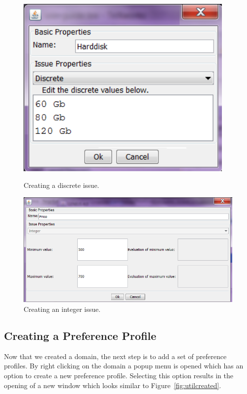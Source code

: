 \documentclass[]{article}
\begin{document}
\begin{figure}[ht]
\center
\begin{minipage}[b]{0.35\linewidth}
	\includegraphics[width=0.95\textwidth]{media/image7a.png}
\caption{Creating a discrete issue.}
\label{fig:createIssueD}
\end{minipage}
\begin{minipage}[b]{0.55\linewidth}
	\includegraphics[width=1.0\textwidth]{media/image7b.png}
\caption{Creating an integer issue.}\label{fig:createIssueI}
\end{minipage}
\end{figure}

\subsection{Creating a Preference Profile}
Now that we created a domain, the next step is to add a set of preference profiles. By right clicking on the domain a popup menu is opened which has an option to create a new preference profile. Selecting this option results in the opening of a new window which looks similar to Figure~\ref{fig:utilcreated}.
\end{document}
